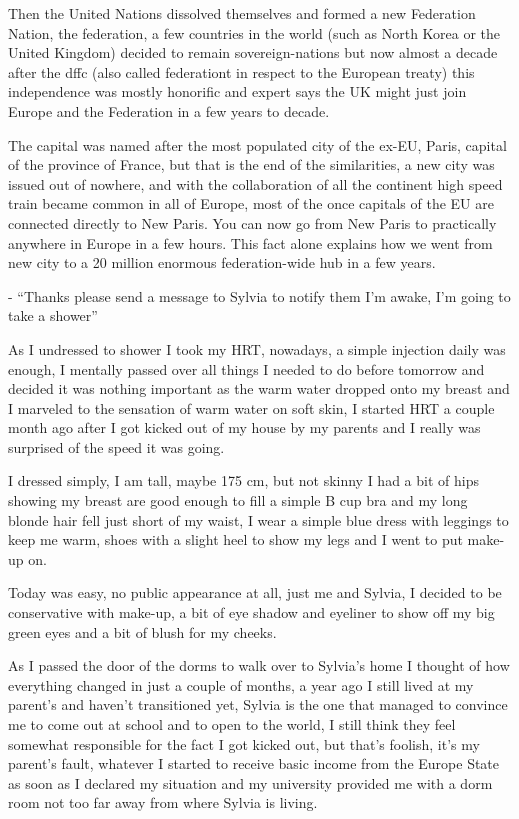 \documentclass[hidelinks,12pt,a4paper]{book}
\begin{document}
Then the United Nations dissolved themselves and formed a new Federation Nation, 
the \gls{federation}, a few countries in the world (such as North Korea or the United Kingdom) 
decided to remain sovereign-nations but now almost a decade after the \gls{dffc} (also called \gls{federationt} in respect to the European treaty) this independence was mostly honorific 
and expert says the UK might just join Europe and the Federation in a few years to decade.\par
\bigskip

The capital was named after the most populated city of the ex-EU, 
Paris, capital of the province of France, but that is the end of the similarities, 
a new city was issued out of nowhere, and with the collaboration of all the continent 
high speed train became common in all of Europe, most of the once capitals of the EU are connected directly to New Paris. 
You can now go from New Paris to practically anywhere in Europe in a few hours. 
This fact alone explains how we went from new city to a 20 million enormous federation-wide hub in a few years.\par
\bigskip

- “Thanks please send a message to Sylvia to notify them I'm awake, I'm going to take a shower”\par
\bigskip
As I undressed to shower I took my HRT, nowadays, a simple injection daily was enough, 
I mentally passed over all things I needed to do before tomorrow and decided it was nothing 
important as the warm water dropped onto my breast and I marveled to the sensation of warm water on soft skin, 
I started HRT a couple month ago after I got kicked out of my house by my parents and 
I really was surprised of the speed it was going.\par
\bigskip

I dressed simply, I am tall, maybe 175 cm, 
but not skinny I had a bit of hips showing my breast are good enough to fill a simple B cup bra and 
my long blonde hair fell just short of my waist, I wear a simple blue dress with leggings to keep me warm, 
shoes with a slight heel to show my legs and I went to put make-up on.\par
\bigskip

Today was easy, no public appearance at all, just me and Sylvia, I decided to be conservative with make-up, 
a bit of eye shadow and eyeliner to show off my big green eyes and a bit of blush for my cheeks.\par
\bigskip

As I passed the door of the dorms to walk over to Sylvia's home 
I thought of how everything changed in just a couple of months, a year ago I still lived at my parent's 
and haven't transitioned yet, Sylvia is the one that managed to convince me to come out at school and to open to the world, 
I still think they feel somewhat responsible for the fact I got kicked out, but that's foolish, it's my parent's fault, 
whatever I started to receive basic income from the Europe State as soon as I declared my situation and my 
university provided me with a dorm room not too far away from where Sylvia is living.\par
\bigskip
\end{document}
